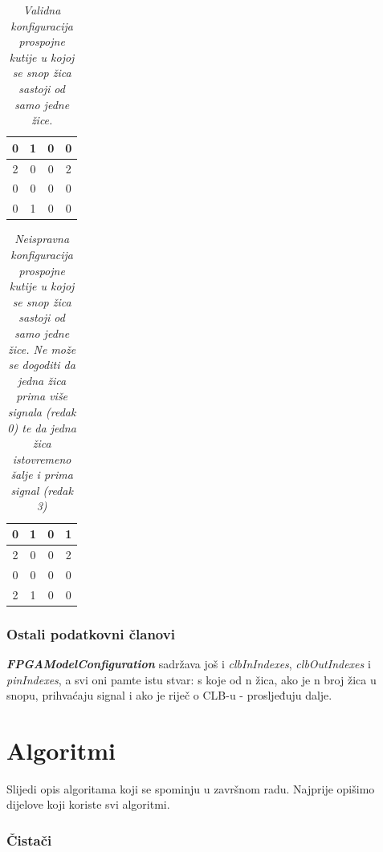 \documentclass[times, utf8, zavrsni]{fer}
\begin{document}
	
	\begin{table}[htb]
		\caption{\emph{Validna konfiguracija prospojne kutije u kojoj se snop žica sastoji od samo jedne žice.}}
		\label{swConfValid}
		\centering
		\begin{tabular}{|c|c|c|c|} \hline
			0 & 1 & 0 & 0 \\ \hline
			2 & 0 & 0 & 2 \\ \hline
			0 & 0 & 0 & 0 \\ \hline
			0 & 1 & 0 & 0 \\ \hline
		\end{tabular}
	\end{table}
	
	
	\begin{table}[!htb]
		\caption{\emph{Neispravna konfiguracija prospojne kutije u kojoj se snop žica sastoji od samo jedne žice. Ne može se dogoditi da jedna žica prima više signala (redak 0) te da jedna žica istovremeno šalje i prima signal (redak 3) }}
		\label{swConfInvalid}
		\centering
		\begin{tabular}{|c|c|c|c|} \hline
			0 & 1 & 0 & 1 \\ \hline
			2 & 0 & 0 & 2 \\ \hline
			0 & 0 & 0 & 0 \\ \hline
			2 & 1 & 0 & 0 \\ \hline
		\end{tabular}
	\end{table}
	
	\subsubsection{Ostali podatkovni članovi}
	
	\textbf{\emph{FPGAModelConfiguration}} sadržava još i \emph{clbInIndexes}, \emph{clbOutIndexes} i \emph{pinIndexes}, a svi oni pamte istu stvar: s koje od n žica, ako je n broj žica u snopu, prihvaćaju signal i ako je riječ o CLB-u - prosljeđuju dalje.
	
	\section{Algoritmi}
	
	Slijedi opis algoritama koji se spominju u završnom radu. Najprije opišimo dijelove koji koriste svi algoritmi.
	
	\subsubsection{Čistači}
	
\end{document}
